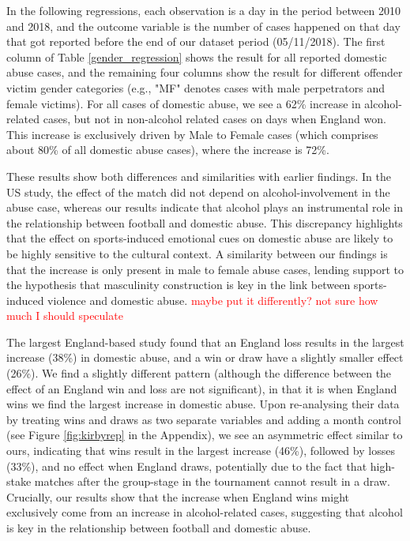 \documentclass[12pt, letterpaper]{article}
\begin{document}
In the following regressions, each observation is a day in the period between 2010 and 2018, and the outcome variable is the number of cases happened on that day that got reported before the end of our dataset period (05/11/2018). The first column of Table \ref{gender_regression} shows the result for all reported domestic abuse cases, and the remaining four columns show the result for different offender victim gender categories (e.g., "MF" denotes cases with male perpetrators and female victims). For all cases of domestic abuse, we see a 62\% increase in alcohol-related cases, but not in non-alcohol related cases on days when England won. This increase is exclusively driven by Male to Female cases (which comprises about 80\% of all domestic abuse cases), where the increase is 72\%. 

These results show both differences and similarities with earlier findings. In the US study\autocite{Card2011}, the effect of the match did not depend on alcohol-involvement in the abuse case, whereas our results indicate that alcohol plays an instrumental role in the relationship between football and domestic abuse. This discrepancy highlights that the effect on sports-induced emotional cues on domestic abuse are likely to be highly sensitive to the cultural context. A similarity between our findings is that the increase is only present in male to female abuse cases, lending support to the hypothesis that masculinity construction is key in the link between sports-induced violence and domestic abuse. \textcolor{red}{maybe put it differently? not sure how much I should speculate}

The largest England-based study found that an England loss results in the largest increase (38\%) in domestic abuse, and a win or draw have a slightly smaller effect (26\%). We find a slightly different pattern (although the difference between the effect of an England win and loss are not significant), in that it is when England wins we find the largest increase in domestic abuse. Upon re-analysing their data by treating wins and draws as two separate variables and adding a month control (see Figure \ref{fig:kirbyrep} in the Appendix), we see an asymmetric effect similar to ours, indicating that wins result in the largest increase (46\%), followed by losses (33\%), and no effect when England draws, potentially due to the fact that high-stake matches after the group-stage in the tournament cannot result in a draw. Crucially, our results show that the increase when England wins might exclusively come from an increase in alcohol-related cases, suggesting that alcohol is key in the relationship between football and domestic abuse.
\end{document}
